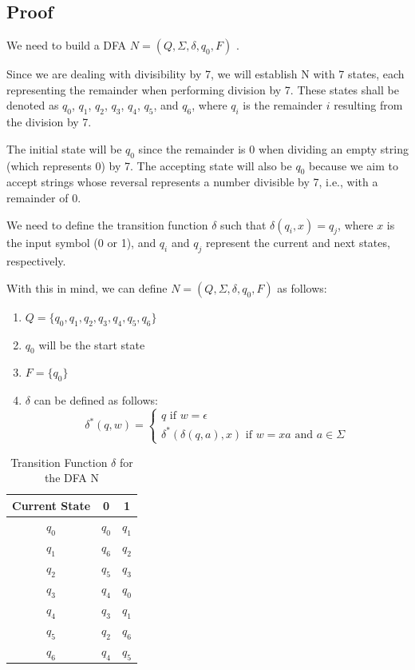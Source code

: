 \documentclass[12pt]{article}
\begin{document}
\setcounter{subsection}{4}

\subsection{Proof} 

We need to build a DFA $N = (Q, \Sigma, \delta, q_0, F)$ .  

Since we are dealing with divisibility by 7, we will establish N with 7 states, each representing the remainder when performing division by 7. These states shall be denoted as \(q_0\), \(q_1\), \(q_2\), \(q_3\), \(q_4\), \(q_5\), and \(q_6\), where \(q_i\) is the remainder \(i\) resulting from the division by 7. 

The initial state will be \(q_0\) since the remainder is 0 when dividing an empty string (which represents 0) by 7. The accepting state will also be \(q_0\) because we aim to accept strings whose reversal represents a number divisible by 7, i.e., with a remainder of 0. 

We need to define the transition function \(\delta\) such that \(\delta(q_i, x) = q_j\), where \(x\) is the input symbol (0 or 1), and \(q_i\) and \(q_j\) represent the current and next states, respectively.

With this in mind, we can define $N = (Q, \Sigma, \delta, q_0, F)$ as follows:
\begin{enumerate}
\item $Q =  \{q_0, q_1, q_2, q_3, q_4, q_5, q_6\}$ 
\item $q_0$ will be the start state 
\item $F = \{q_0\}$
\item $\delta$ can be defined as follows:
  \[
\delta^*(q, w) =
\begin{cases}
q \text{ if } w = \epsilon  \\
\delta^*(\delta(q, a), x) \text{ if } w=xa \text{ and } a \in \Sigma
\end{cases}
\]
\end{enumerate}
\begin{table}[h]
\centering
\begin{tabular}{|c|c|c|}
\hline
\textbf{Current State} & \textbf{0}& \textbf{1}\\
\hline
$q_0$ & $q_0$ & $q_1$ \\
$q_1$ & $q_6$ & $q_2$ \\
$q_2$ & $q_5$ & $q_3$ \\
$q_3$ & $q_4$ & $q_0$ \\
$q_4$ & $q_3$ & $q_1$ \\
$q_5$ & $q_2$ & $q_6$ \\
$q_6$ & $q_4$ & $q_5$ \\
\hline
\end{tabular}
\caption{ Transition Function $\delta$ for the DFA N}
\end{table}
\end{document}
